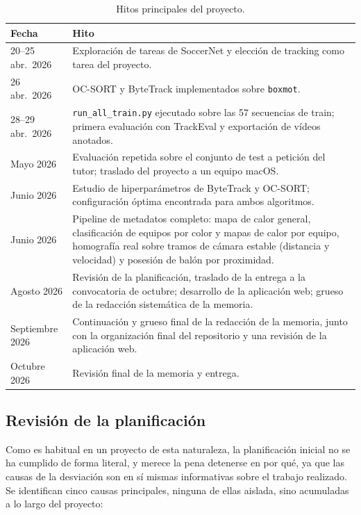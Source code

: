 \begin{table}[htp]
\centering
\caption{Hitos principales del proyecto.}
\label{tab:gestion-hitos}
\renewcommand{\arraystretch}{1.3}
\begin{tabular}{|p{2.6cm}|p{9.4cm}|}
\hline
\rowcolor{gray!25}
\textbf{Fecha} & \textbf{Hito} \\
\hline
20--25 abr.\ 2026 & Exploración de tareas de SoccerNet y elección de
  tracking como tarea del proyecto. \\
\hline
26 abr.\ 2026 & OC-SORT y ByteTrack implementados sobre \texttt{boxmot}. \\
\hline
28--29 abr.\ 2026 & \texttt{run\_all\_train.py} ejecutado sobre las 57
  secuencias de train; primera evaluación con TrackEval y exportación de
  vídeos anotados. \\
\hline
Mayo 2026 & Evaluación repetida sobre el conjunto de test a petición del
  tutor; traslado del proyecto a un equipo macOS. \\
\hline
Junio 2026 & Estudio de hiperparámetros de ByteTrack y OC-SORT;
  configuración óptima encontrada para ambos algoritmos. \\
\hline
Junio 2026 & Pipeline de metadatos completo: mapa de calor general,
  clasificación de equipos por color y mapas de calor por equipo,
  homografía real sobre tramos de cámara estable (distancia y velocidad)
  y posesión de balón por proximidad. \\
\hline
Agosto 2026 & Revisión de la planificación, traslado de la entrega a la
  convocatoria de octubre; desarrollo de la aplicación web; grueso de la
  redacción sistemática de la memoria. \\
\hline
Septiembre 2026 & Continuación y grueso final de la redacción de la
  memoria, junto con la organización final del repositorio y una
  revisión de la aplicación web. \\
\hline
Octubre 2026 & Revisión final de la memoria y entrega. \\
\hline
\end{tabular}
\end{table}

\subsection{Revisión de la planificación}
\label{subsec:gestion-revision}

Como es habitual en un proyecto de esta naturaleza, la planificación
inicial no se ha cumplido de forma literal, y merece la pena detenerse en
por qué, ya que las causas de la desviación son en sí mismas informativas
sobre el trabajo realizado. Se identifican cinco causas principales,
ninguna de ellas aislada, sino acumuladas a lo largo del proyecto:


